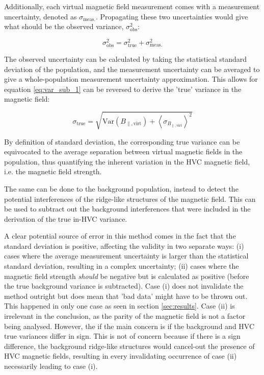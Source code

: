 Additionally, each virtual magnetic field measurement comes with a measurement uncertainty, denoted as $\sigma_{\mathrm{meas.}}$. Propagating these two uncertainties would give what should be the observed variance, $\sigma_{\mathrm{obs}}^2$:


\begin{equation}
    \sigma_{\mathrm{obs}}^2 = \sigma_{\mathrm{true}}^2 + \sigma_{\mathrm{meas.}}^2
\label{eq:var_sub_1}
\end{equation}


The observed uncertainty can be calculated by taking the statistical standard deviation of the population, and the measurement uncertainty can be averaged to give a whole-population measurement uncertainty approximation. This allows for equation \ref{eq:var_sub_1} can be reversed to derive the 'true' variance in the magnetic field:


\begin{equation}
    \sigma_{\mathrm{true}} = \sqrt{\mathrm{Var}\left(B_{\parallel, \mathrm{virt}}\right) + {\left<\sigma_{B_{\parallel, \mathrm{virt}}}\right>}^2}
\label{eq:var_sub_2}
\end{equation}


By definition of standard deviation, the corresponding true variance can be equivocated to the average separation between virtual magnetic fields in the population, thus quantifying the inherent variation in the HVC magnetic field, i.e. the magnetic field strength.


The same can be done to the background population, instead to detect the potential interferences of the ridge-like structures of the magnetic field. This can be used to subtract out the background interferences that were included in the derivation of the true in-HVC variance.


A clear potential source of error in this method comes in the fact that the standard deviation is positive, affecting the validity in two separate ways: (i) cases where the average measurement uncertainty is larger than the statistical standard deviation, resulting in a complex uncertainty; (ii) cases where the magnetic field strength \textit{should} be negative but is calculated as positive (before the true background variance is subtracted). Case (i) does not invalidate the method outright but does mean that 'bad data' might have to be thrown out. This happened in only one case as seen in section \ref{sec:results}. Case (ii) is irrelevant in the conclusion, as the parity of the magnetic field is not a factor being analysed. However, the if the main concern is if the background and HVC true variances differ in sign. This is not of concern because if there is a sign difference, the background ridge-like structures would cancel-out the presence of HVC magnetic fields, resulting in every invalidating occurrence of case (ii) necessarily leading to case (i).


